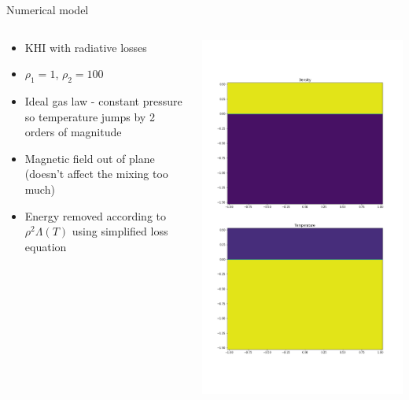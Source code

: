 \documentclass[10pt,aspectratio=169,usenames,dvipsnames]{beamer}
\begin{document}
\begin{frame}{Numerical model}
\begin{columns}
\begin{column}{0.65\textwidth}
\begin{itemize}
    \item KHI with radiative losses
    \item $\rho_1 =1$, $\rho_2 =100$
    \item Ideal gas law - constant pressure so temperature jumps by 2 orders of magnitude
    \item Magnetic field out of plane (doesn't affect the mixing too much)
    \item Energy removed according to $\rho^2 \Lambda (T)$ using simplified loss equation
\end{itemize}
\end{column}
\begin{column}{0.35\textwidth}
\includegraphics[width=0.95\linewidth]{2023Dundee/Figures/ic.png}
\end{column}
\end{columns}
\end{frame}
\end{document}
